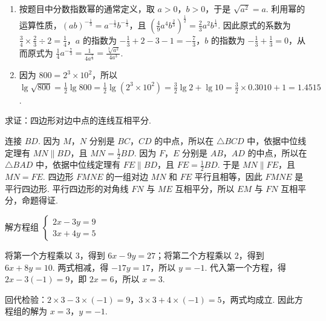 \begin{solution}
\begin{enumerate}
\item 按题目中分数指数幂的通常定义，取 \(a>0\)，\(b>0\)，于是 \(\sqrt{a^2}=a\). 利用幂的运算性质，\(\left(ab\right)^{-\frac{1}{3}}=a^{-\frac{1}{3}}b^{-\frac{1}{3}}\)，且 \(\left(\frac{4}{9}a^4b^{\frac{2}{3}}\right)^{\frac{1}{2}}=\frac{2}{3}a^2b^{\frac{1}{3}}\). 因此原式的系数为 \(\frac{3}{4}\times\frac{2}{3}\div2=\frac14\)，\(a\) 的指数为 \(-\frac13+2-3-1=-\frac73\)，\(b\) 的指数为 \(-\frac13+\frac13=0\)，从而原式为 \(\frac{1}{4}a^{-\frac73}=\frac{1}{4a^{\frac73}}=\frac{\sqrt[3]{a^2}}{4a^3}\).

\item 因为 \(800=2^3\times10^2\)，所以 \(\lg\sqrt{800}=\frac{1}{2}\lg800=\frac{1}{2}\lg\left(2^3\times10^2\right)=\frac{3}{2}\lg2+\lg10=\frac{3}{2}\times0.3010+1=1.4515\).
\end{enumerate}
\end{solution}

\begin{problem}
求证：四边形对边中点的连线互相平分.

\end{problem}

\begin{solution}
连接 \(BD\). 因为 \(M\)，\(N\) 分别是 \(BC\)，\(CD\) 的中点，所以在 \(\triangle BCD\) 中，依据中位线定理有 \(MN\parallel BD\)，且 \(MN=\frac{1}{2}BD\). 因为 \(F\)，\(E\) 分别是 \(AB\)，\(AD\) 的中点，所以在 \(\triangle BAD\) 中，依据中位线定理有 \(FE\parallel BD\)，且 \(FE=\frac{1}{2}BD\). 于是 \(MN\parallel FE\)，且 \(MN=FE\). 四边形 \(FMNE\) 的一组对边 \(MN\) 和 \(FE\) 平行且相等，因此 \(FMNE\) 是平行四边形. 平行四边形的对角线 \(FN\) 与 \(ME\) 互相平分，所以 \(EM\) 与 \(FN\) 互相平分，命题得证.
\end{solution}

\begin{problem}
解方程组 \( \begin{cases}
2x-3y=9\\
3x+4y=5
\end{cases} \)
\end{problem}

\begin{solution}
将第一个方程乘以 \(3\)，得到 \(6x-9y=27\)；将第二个方程乘以 \(2\)，得到 \(6x+8y=10\). 两式相减，得 \(-17y=17\)，所以 \(y=-1\). 代入第一个方程，得 \(2x-3\left(-1\right)=9\)，即 \(2x=6\)，所以 \(x=3\).

回代检验：\(2\times3-3\times\left(-1\right)=9\)，\(3\times3+4\times\left(-1\right)=5\)，两式均成立. 因此方程组的解为 \(x=3\)，\(y=-1\).
\end{solution}

